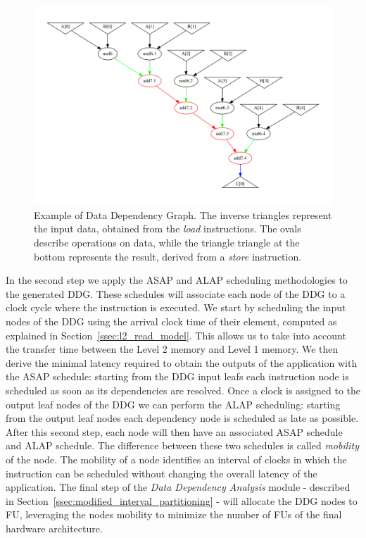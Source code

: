\begin{figure}[tb] 
\centering
\includegraphics[width=.9\columnwidth,left]{images/supernode.pdf}
    \caption{\small Example of Data Dependency Graph. The inverse triangles represent the input data, obtained from the \textit{load} instructions. The ovals describe operations on data, while the triangle triangle at the bottom represents the result, derived from a \textit{store} instruction.}
\label{fig:ddg}
\end{figure}
In the second step we apply the ASAP and ALAP scheduling methodologies to the generated DDG. These schedules will associate each node of the DDG to a clock cycle where the instruction is executed. We start by scheduling the input nodes of the DDG using the arrival clock time of their element, computed as explained in Section~\ref{ssec:l2_read_model}. This allows us to take into account the transfer time between the Level 2 memory and Level 1 memory. We then derive the minimal latency required to obtain the outputs of the application with the ASAP schedule: starting from the DDG input leafs each instruction node is scheduled as soon as its dependencies are resolved. 
Once a clock is assigned to the output leaf nodes of the DDG we can perform the ALAP scheduling: starting from the output leaf nodes each dependency node is scheduled as late as possible. After this second step, each node will then have an associated ASAP schedule and ALAP schedule. The difference between these two schedules is called \textit{mobility} of the node. The mobility of a node identifies an interval of clocks in which the instruction can be scheduled without changing the overall latency of the application.
The final step of the \textit{Data Dependency Analysis} module - described in Section~\ref{ssec:modified_interval_partitioning} - will allocate the DDG nodes to FU, leveraging the nodes mobility to minimize the number of FUs of the final hardware architecture. 

